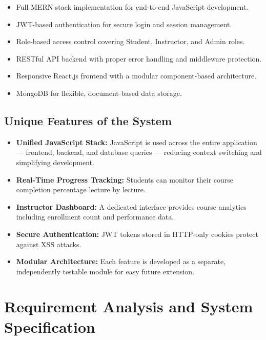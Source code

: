 \documentclass[12pt, a4paper, oneside]{report}
\begin{document}
\begin{itemize}[leftmargin=1.5cm, itemsep=2pt]
  \item Full MERN stack implementation for end-to-end JavaScript development.
  \item JWT-based authentication for secure login and session management.
  \item Role-based access control covering Student, Instructor, and Admin roles.
  \item RESTful API backend with proper error handling and middleware protection.
  \item Responsive React.js frontend with a modular component-based architecture.
  \item MongoDB for flexible, document-based data storage.
\end{itemize}

\section{Unique Features of the System}

\begin{itemize}[leftmargin=1.5cm, itemsep=2pt]
  \item \textbf{Unified JavaScript Stack:} JavaScript is used across the entire application --- frontend, backend, and database queries --- reducing context switching and simplifying development.
  \item \textbf{Real-Time Progress Tracking:} Students can monitor their course completion percentage lecture by lecture.
  \item \textbf{Instructor Dashboard:} A dedicated interface provides course analytics including enrollment count and performance data.
  \item \textbf{Secure Authentication:} JWT tokens stored in HTTP-only cookies protect against XSS attacks.
  \item \textbf{Modular Architecture:} Each feature is developed as a separate, independently testable module for easy future extension.
\end{itemize}

\chapter{Requirement Analysis and System Specification}
\end{document}
